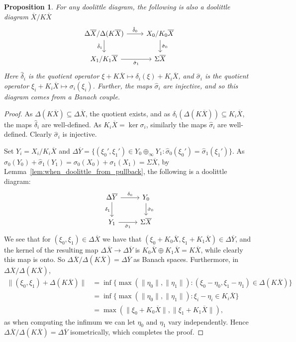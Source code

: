 \documentclass[a4paper,11pt]{article}
\theoremstyle{plain}
\newtheorem{proposition}{Proposition}[section]
\theoremstyle{remark}
\begin{document}
\begin{proposition}\label{prop:quotient_by_kernel}
For any doolittle diagram, the following is also a doolittle diagram $\overline X / K\overline X$
\[ \begin{tikzcd}
\Delta\overline X / \Delta(K\overline X) \arrow[r, "\hat\delta_0"] \arrow[d, "\hat\delta_1"'] & X_0 / K_0\overline X\arrow[d, "\hat\sigma_0"] \\
X_1 / K_1\overline X \arrow[r, "\hat\sigma_1"'] & \Sigma\overline X
\end{tikzcd}
\]
Here $\hat\delta_i$ is the quotient operator $\xi+K\overline X \mapsto \delta_i(\xi) + K_i\overline X$, and $\hat\sigma_i$ is the quotient operator $\xi_i + K_i\overline X \mapsto \sigma_i(\xi_i)$.  Further, the maps $\hat\sigma_i$ are injective, and so this diagram comes from a Banach couple.
\end{proposition}
\begin{proof}
As $\Delta(K\overline X) \subseteq \Delta\overline X$, the quotient exists, and as $\delta_i(\Delta(K\overline X)) \subseteq K_i\overline X$, the maps $\hat\delta_i$ are well-defined.  As $K_i\overline X = \ker\sigma_i$, similarly the maps $\hat\sigma_i$ are well-defined.  Clearly $\hat\sigma_i$ is injective.

Set $Y_i = X_i / K_i\overline X$ and $\Delta\overline Y = \{ (\xi_0', \xi_1') \in Y_0 \oplus_\infty Y_1 : \hat\sigma_0(\xi_0') = \hat\sigma_1(\xi_1') \}$.  As $\hat\sigma_0(Y_0) + \hat\sigma_1(Y_1) = \sigma_0(X_0) + \sigma_1(X_1) = \Sigma\overline X$, by Lemma~\ref{lem:when_doolittle_from_pullback}, the following is a doolittle diagram:
\[ \begin{tikzcd}
\Delta\overline Y \arrow[r, "\delta_0"] \arrow[d, "\delta_1"'] & Y_0 \arrow[d, "\hat\sigma_0"] \\
Y_1 \arrow[r, "\hat\sigma_1"'] & \Sigma\overline X
\end{tikzcd} \]
We see that for $(\xi_0,\xi_1)\in \Delta\overline X$ we have that $(\xi_0+K_0\overline X, \xi_1+K_1\overline X) \in \Delta\overline Y$, and the kernel of the resulting map $\Delta\overline X \to \Delta\overline Y$ is $K_0\overline X \oplus K_1\overline X = K\overline X$, while clearly this map is onto.  So $\Delta\overline X / \Delta(K\overline X) = \Delta\overline Y$ as Banach spaces.
Furthermore, in $\Delta\overline X / \Delta(K\overline X)$,
\begin{align*}
\| (\xi_0,\xi_1) + \Delta(K\overline X) \|
&= \inf\{ \max(\|\eta_0\|, \|\eta_1\|) : (\xi_0 - \eta_0, \xi_1-\eta_1) \in \Delta(K\overline X) \} \\
&= \inf\{ \max(\|\eta_0\|, \|\eta_1\|) : \xi_i - \eta_i \in K_i\overline X \} \\
&= \max( \|\xi_0+K_0\overline X\|, \|\xi_1+K_1\overline X\| ),
\end{align*}
as when computing the infimum we can let $\eta_0$ and $\eta_1$ vary independently.  Hence $\Delta\overline X / \Delta(K\overline X) = \Delta\overline Y$ isometrically, which completes the proof.
\end{proof}
\end{document}
